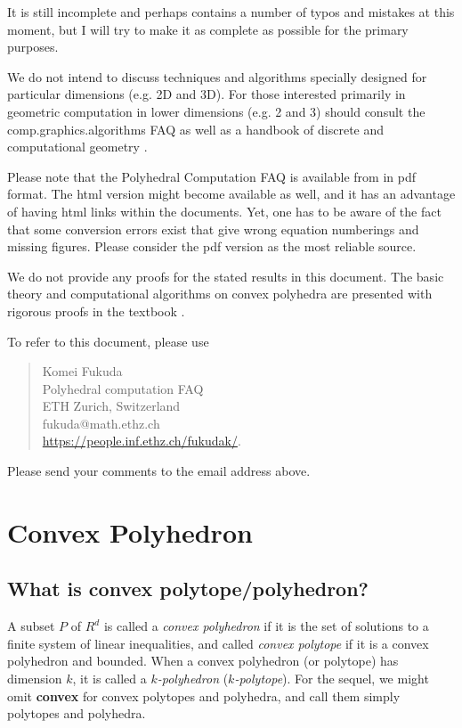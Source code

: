 \documentclass[[a4paper,12pt]{article}
\begin{document}
It is still incomplete and perhaps contains a number of
typos and mistakes at this moment, but I will try to
make it as complete as possible for the primary purposes.

We do not intend to discuss techniques and algorithms
specially designed for particular dimensions (e.g. 2D and 3D).
For those interested primarily in geometric computation in
lower dimensions (e.g. 2 and 3) should consult the
 comp.graphics.algorithms {FAQ}
 \cite{o-cgafaq} as well as a handbook of discrete and 
computational geometry \cite{go-hbdcg-97}.

Please note that the Polyhedral Computation FAQ is available from 
\cite{f-kfhome} in pdf format. The html version might become
available as well, and it has an advantage of having
html links within the documents.  Yet, one has to be aware of
the fact that some conversion errors exist that give 
wrong equation numberings and
missing figures.  Please consider the pdf version as the most reliable source.

We do not provide any proofs for the stated results in this document.
 The basic theory and computational algorithms on convex polyhedra are presented
with rigorous proofs in the textbook \cite{f-pc-20}.

To refer to this document, please use
\begin{quote}
Komei Fukuda\\
Polyhedral computation {FAQ}\\
 ETH Zurich, Switzerland\\
    fukuda@math.ethz.ch\\
\url{https://people.inf.ethz.ch/fukudak/}.
\end{quote}
Please send your comments to the email address above.
\section{Convex Polyhedron}  \label{Sec:polytope}
\subsection{What is convex polytope/polyhedron?} \label{polytope:polytope}

A subset $P$ of $R^d$ is called a {\em convex polyhedron\/} if it is
the set of solutions to a finite system of linear inequalities, and 
called {\em convex polytope\/} if it is a convex polyhedron and bounded.
When a convex polyhedron (or polytope) has dimension $k$, it is
called a {\em $k$-polyhedron\/} ({\em $k$-polytope\/}).
For the sequel, we might omit  {\bf convex} for convex polytopes
and polyhedra, and call them simply polytopes and polyhedra.
\end{document}
